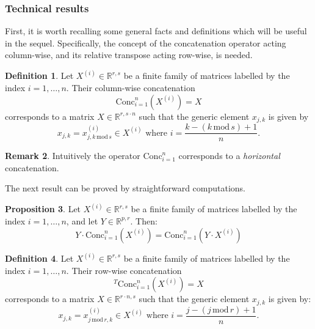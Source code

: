 \documentclass[11pt,a4paper,reqno]{amsart} %
\theoremstyle{definition}
\newtheorem{defn}{Definition}[subsection]
\newtheorem{prop}[defn]{Proposition}
\newtheorem{rem}[defn]{Remark}
\numberwithin{equation}{section}          %
\begin{document}
\subsubsection{Technical results}
First, it is worth recalling some general facts and definitions which will be useful in the sequel. Specifically, the concept of the concatenation operator acting column-wise, and its relative transpose acting row-wise, is needed.

\begin{defn}
Let $X^{(i)} \in \mathbb{R}^{r, s}$ be a finite family of matrices labelled by the index $i=1, \dots, n$. Their column-wise concatenation 
\begin{equation}
\mathrm{Conc}_{i=1}^n \left(X^{(i)} \right)=X
\end{equation}
corresponds to a matrix $X \in \mathbb{R}^{r , s \cdot n}$ such that the generic element $x_{j,k}$ is given by
\begin{equation}
x_{j,k}=x^{(i)}_{j,k \, \mathrm{mod} \, s} \in X^{(i)} \text{ where } i=\frac{ k -(k \, \mathrm{mod} \, s) +1}{n}.
\end{equation}
\end{defn}

\begin{rem}
Intuitively the operator $\mathrm{Conc}_{i=1}^n$ corresponds to a \textit{horizontal} concatenation.
\end{rem}
The next result can be proved by straightforward computations. 
\begin{prop}
Let $X^{(i)} \in \mathbb{R}^{r , s}$ be a finite family of matrices labelled by the index $i=1, \dots, n$, and let $Y \in \mathbb{R}^{p , r}$. Then:
\begin{equation}
Y \cdot \mathrm{Conc}_{i=1}^n \left(X^{(i)} \right)=\mathrm{Conc}_{i=1}^n \left(Y \cdot X^{(i)} \right)
\end{equation}
\end{prop}

\begin{defn}
Let $X^{(i)} \in \mathbb{R}^{r, s}$ be a finite family of matrices labelled by the index $i=1, \dots, n$. Their row-wise concatenation 
\begin{equation}
{}^{T}\mathrm{Conc}_{i=1}^n \left(X^{(i)} \right)=X
\end{equation}
corresponds to a matrix $X \in \mathbb{R}^{r \cdot n , s }$ such that the generic element $x_{j,k}$ is given by:
\begin{equation}
x_{j,k}=x^{(i)}_{j \, \mathrm{mod} \, r,k } \in X^{(i)} \text{ where } i=\frac{ j -(j \, \mathrm{mod} \, r) +1}{n}.
\end{equation}
\end{defn}
\end{document}
